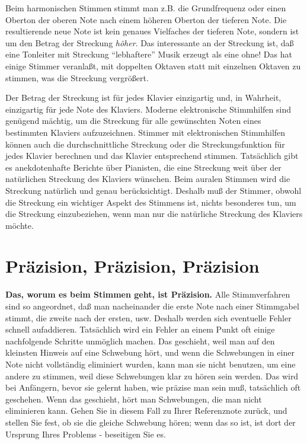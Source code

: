 Beim harmonischen Stimmen stimmt man z.B. die Grundfrequenz oder einen Oberton der oberen Note nach einem höheren Oberton der tieferen Note.
Die resultierende neue Note ist kein genaues Vielfaches der tieferen Note, sondern ist um den Betrag der Streckung \textit{höher}.
Das interessante an der Streckung ist, daß eine Tonleiter mit Streckung \enquote{lebhaftere} Musik erzeugt als eine ohne!
Das hat einige Stimmer veranlaßt, mit doppelten Oktaven statt mit einzelnen Oktaven zu stimmen, was die Streckung vergrößert.

Der Betrag der Streckung ist für jedes Klavier einzigartig und, in Wahrheit, einzigartig für jede Note des Klaviers.
Moderne elektronische Stimmhilfen sind genügend mächtig, um die Streckung für alle gewünschten Noten eines bestimmten Klaviers aufzuzeichnen.
Stimmer mit elektronischen Stimmhilfen können auch die durchschnittliche Streckung oder die Streckungsfunktion für jedes Klavier berechnen und das Klavier entsprechend stimmen.
Tatsächlich gibt es anekdotenhafte Berichte über Pianisten, die eine Streckung weit über der natürlichen Streckung des Klaviers wünschen.
Beim auralen Stimmen wird die Streckung natürlich und genau berücksichtigt.
Deshalb muß der Stimmer, obwohl die Streckung ein wichtiger Aspekt des Stimmens ist, nichts besonderes tun, um die Streckung einzubeziehen, wenn man nur die natürliche Streckung des Klaviers möchte.
 

\hypertarget{c2_5l}{}
\section{Präzision, Präzision, Präzision}\hypertarget{c2_5_prae}{} 

\textbf{Das, worum es beim Stimmen geht, ist Präzision.}
Alle Stimmverfahren sind so angeordnet, daß man nacheinander die erste Note nach einer Stimmgabel stimmt, die zweite nach der ersten, usw.
Deshalb werden sich eventuelle Fehler schnell aufaddieren.
Tatsächlich wird ein Fehler an einem Punkt oft einige nachfolgende Schritte unmöglich machen.
Das geschieht, weil man auf den kleinsten Hinweis auf eine Schwebung hört, und wenn die Schwebungen in einer Note nicht vollständig eliminiert wurden, kann man sie nicht benutzen, um eine andere zu stimmen, weil diese Schwebungen klar zu hören sein werden.
Das wird bei Anfängern, bevor sie gelernt haben, wie präzise man sein muß, tatsächlich oft geschehen.
Wenn das geschieht, hört man Schwebungen, die man nicht eliminieren kann.
Gehen Sie in diesem Fall zu Ihrer Referenznote zurück, und stellen Sie fest, ob sie die gleiche Schwebung hören; wenn das so ist, ist dort der Ursprung Ihres Problems - beseitigen Sie es.

